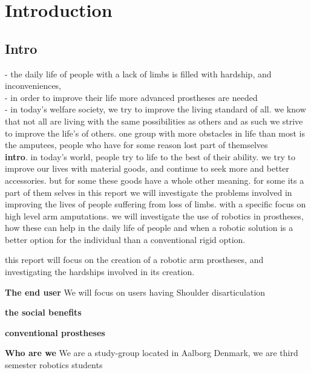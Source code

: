 \chapter{Introduction}\label{ch:Introduction}

\section{Intro}
    
    - the daily life of people with a lack of limbs is filled with hardship, and inconveniences, \\
    - in order to improve their life more advanced prostheses are needed\\
    - in today's welfare society, we try to improve the living standard of all. we know that not all are living with the same possibilities as others and as such we strive to improve the life's of others. 
    one group with more obstacles in life than most is the amputees, people who have for some reason lost part of themselves\\
    
\textbf{intro}. in today's world, people try to life to the best of their ability. we try to improve our lives with material goods, and continue to seek more and better accessories. but for some these goods have a whole other meaning. for some its a part of them selves
in this report we will investigate the problems involved in improving the lives of people suffering from loss of limbs. with a specific focus on high level arm amputations. 
we will investigate the use of robotics in prostheses, how these can help in the daily life of people and when a robotic solution is a better option for the individual than a conventional rigid option.

this report will focus on the creation of a robotic arm prostheses, and investigating the hardships involved in its creation. 


\textbf{The end user}
We will focus on 
users having Shoulder disarticulation

\textbf{the social benefits}

\textbf{conventional prostheses}

\textbf{Who are we}
We are a study-group located in Aalborg Denmark, we are third semester robotics students

